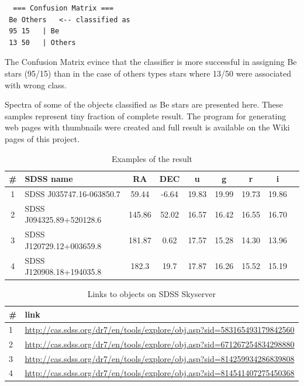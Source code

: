 \begin{lstlisting}
  === Confusion Matrix ===
 Be Others   <-- classified as
 95 15   | Be
 13 50   | Others
\end{lstlisting}

The Confusion Matrix evince that the classifier is more successful in
assigning Be stars (95/15) than in the case of others types stars
where 13/50 were associated with wrong class.



Spectra of some of the objects classified as Be stars are presented
here. These samples represent tiny fraction of complete result. The
program for generating web pages with thumbnails were created and full
result is available on the Wiki pages of this
project. 


\begin{table}[ht]
  \small
     \begin{tabular}[ht]{c l c c c c c c c}
       \toprule 
     \# &SDSS name & RA & DEC & u  & g & r & i \\
   \midrule
   1&SDSS J035747.16-063850.7& 59.44 & -6.64& 19.83 &19.99& 19.73&19.86 \\ 
   2&SDSS J094325.89+520128.6& 145.86& 52.02& 16.57 &16.42& 16.55& 16.70\\ 
   3&SDSS J120729.12+003659.8& 181.87& 0.62 & 17.57 &15.28& 14.30& 13.96\\ 
   4&SDSS J120908.18+194035.8& 182.3 & 19.7 & 17.87 &16.26& 15.52& 15.19\\ 
   \bottomrule
   \end{tabular}
  \caption{Examples of the result}
  \label{tab:Result}
\end{table}


\begin{table}[ht]
  \small
     \begin{tabular}[ht]{l l}
       \toprule
     \# & link \\
   \midrule
   1& \url{http://cas.sdss.org/dr7/en/tools/explore/obj.asp?sid=583165493179842560} \\   
   2& \url{http://cas.sdss.org/dr7/en/tools/explore/obj.asp?sid=671267254834298880}\\ 
   3& \url{http://cas.sdss.org/dr7/en/tools/explore/obj.asp?sid=814259934286839808}\\ 
   4& \url{http://cas.sdss.org/dr7/en/tools/explore/obj.asp?sid=814541407275450368}\\ 
   \bottomrule
   \end{tabular}
  \caption{Links to objects on SDSS Skyserver}
  \label{tab:Links}
\end{table}

